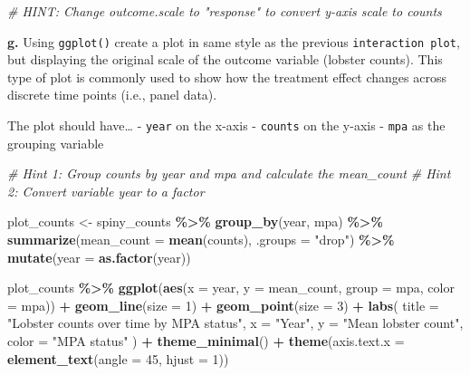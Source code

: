\documentclass[
]{article}
\newenvironment{Shaded}{\begin{snugshade}}{\end{snugshade}}
\newcommand{\AttributeTok}[1]{\textcolor[rgb]{0.13,0.29,0.53}{#1}}
\newcommand{\CommentTok}[1]{\textcolor[rgb]{0.56,0.35,0.01}{\textit{#1}}}
\newcommand{\DecValTok}[1]{\textcolor[rgb]{0.00,0.00,0.81}{#1}}
\newcommand{\FunctionTok}[1]{\textcolor[rgb]{0.13,0.29,0.53}{\textbf{#1}}}
\newcommand{\NormalTok}[1]{#1}
\newcommand{\OtherTok}[1]{\textcolor[rgb]{0.56,0.35,0.01}{#1}}
\newcommand{\SpecialCharTok}[1]{\textcolor[rgb]{0.81,0.36,0.00}{\textbf{#1}}}
\newcommand{\StringTok}[1]{\textcolor[rgb]{0.31,0.60,0.02}{#1}}
\begin{document}
\begin{Shaded}
\begin{Highlighting}[]
\CommentTok{\# HINT: Change \textasciigrave{}outcome.scale\textasciigrave{} to "response" to convert y{-}axis scale to counts}
\end{Highlighting}
\end{Shaded}

\textbf{g.} Using \texttt{ggplot()} create a plot in same style as the
previous \texttt{interaction\ plot}, but displaying the original scale
of the outcome variable (lobster counts). This type of plot is commonly
used to show how the treatment effect changes across discrete time
points (i.e., panel data).

The plot should have\ldots{} - \texttt{year} on the x-axis -
\texttt{counts} on the y-axis - \texttt{mpa} as the grouping variable

\begin{Shaded}
\begin{Highlighting}[]
\CommentTok{\# Hint 1: Group counts by \textasciigrave{}year\textasciigrave{} and \textasciigrave{}mpa\textasciigrave{} and calculate the \textasciigrave{}mean\_count\textasciigrave{}}
\CommentTok{\# Hint 2: Convert variable \textasciigrave{}year\textasciigrave{} to a factor}

\NormalTok{plot\_counts }\OtherTok{\textless{}{-}}\NormalTok{ spiny\_counts }\SpecialCharTok{\%\textgreater{}\%}
  \FunctionTok{group\_by}\NormalTok{(year, mpa) }\SpecialCharTok{\%\textgreater{}\%}
  \FunctionTok{summarize}\NormalTok{(}\AttributeTok{mean\_count =} \FunctionTok{mean}\NormalTok{(counts), }\AttributeTok{.groups =} \StringTok{"drop"}\NormalTok{) }\SpecialCharTok{\%\textgreater{}\%}
  \FunctionTok{mutate}\NormalTok{(}\AttributeTok{year =} \FunctionTok{as.factor}\NormalTok{(year))  }

\NormalTok{plot\_counts }\SpecialCharTok{\%\textgreater{}\%} \FunctionTok{ggplot}\NormalTok{(}\FunctionTok{aes}\NormalTok{(}\AttributeTok{x =}\NormalTok{ year, }
                           \AttributeTok{y =}\NormalTok{ mean\_count, }
                           \AttributeTok{group =}\NormalTok{ mpa, }\AttributeTok{color =}\NormalTok{ mpa)) }\SpecialCharTok{+}
  \FunctionTok{geom\_line}\NormalTok{(}\AttributeTok{size =} \DecValTok{1}\NormalTok{) }\SpecialCharTok{+}  
  \FunctionTok{geom\_point}\NormalTok{(}\AttributeTok{size =} \DecValTok{3}\NormalTok{) }\SpecialCharTok{+}
  \FunctionTok{labs}\NormalTok{(}
    \AttributeTok{title =} \StringTok{"Lobster counts over time by MPA status"}\NormalTok{,}
    \AttributeTok{x =} \StringTok{"Year"}\NormalTok{,}
    \AttributeTok{y =} \StringTok{"Mean lobster count"}\NormalTok{,}
    \AttributeTok{color =} \StringTok{"MPA status"}
\NormalTok{  ) }\SpecialCharTok{+}
  \FunctionTok{theme\_minimal}\NormalTok{() }\SpecialCharTok{+} 
  \FunctionTok{theme}\NormalTok{(}\AttributeTok{axis.text.x =} \FunctionTok{element\_text}\NormalTok{(}\AttributeTok{angle =} \DecValTok{45}\NormalTok{, }\AttributeTok{hjust =} \DecValTok{1}\NormalTok{)) }
\end{Highlighting}
\end{Shaded}
\end{document}
